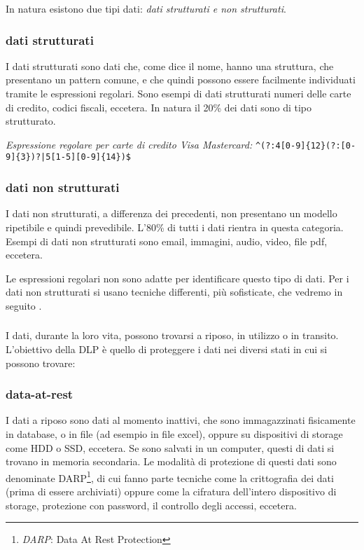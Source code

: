     In natura esistono due tipi dati: \textit{dati strutturati e non strutturati}.
        \subsubsection{dati strutturati}
            I dati strutturati sono dati che, come dice il nome, hanno una struttura, che presentano un pattern comune, e che 
            quindi possono essere facilmente individuati tramite le espressioni regolari. 
            Sono esempi di dati strutturati numeri delle carte di credito, codici fiscali, eccetera.
            In natura il 20\% dei dati sono di tipo strutturato. 
    
            \begin{center} 
                \textit{Espressione regolare per carte di credito Visa Mastercard:}
                \verb/^(?:4[0-9]{12}(?:[0-9]{3})?|5[1-5][0-9]{14})$/ 
            \end{center}

        \subsubsection{dati non strutturati}
            I dati non strutturati, a differenza dei precedenti, non presentano un modello ripetibile
            e quindi prevedibile. L'80\% di tutti i dati rientra in questa categoria. Esempi di dati non 
            strutturati sono email, immagini, audio, video, file pdf, eccetera. 
    
    Le espressioni regolari non sono adatte per identificare questo tipo di dati. %
    Per i dati non strutturati si usano tecniche differenti, più sofisticate, che vedremo in seguito \cite{DLP3}.

    \subsubsection*{}
    I dati, durante la loro vita, possono trovarsi a riposo, in utilizzo o in transito.
    L'obiettivo della DLP è quello di proteggere i dati nei diversi stati in cui si possono trovare:
    \cite{DLP1}

    \subsubsection{data-at-rest}
        I dati a riposo sono dati al momento inattivi, che sono immagazzinati fisicamente in database,
        o in file (ad esempio in file excel), oppure su dispositivi di storage come HDD o SSD, eccetera.
        Se sono salvati in un computer, questi di dati si trovano in memoria secondaria.
        Le modalità di protezione di questi dati sono denominate DARP\footnote{\textit{DARP}: Data At Rest Protection}, 
        di cui fanno parte tecniche come la crittografia dei dati (prima di essere archiviati) oppure come la cifratura
        dell'intero dispositivo di storage, protezione con password, il controllo degli accessi, eccetera.

